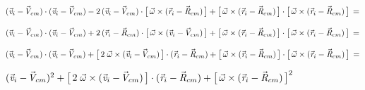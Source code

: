\documentclass[10pt]{article}
\begin{document}
\par \bigskip\smallskip \noindent $({\vec{\mathit{v}}}_i - \hspace{-0.120em}{\vec{\mathit{V}}}_{cm}) \cdot ({\vec{\mathit{v}}}_i - \hspace{-0.120em}{\vec{\mathit{V}}}_{cm}) - 2 \, ({\vec{\mathit{v}}}_i - \hspace{-0.120em}{\vec{\mathit{V}}}_{cm}) \cdot \big [ \, {\vec{\omega}} \times ({\vec{\mathit{r}}}_i - {\vec{\mathit{R}}}_{cm}) \, \big ] + \big [ \, {\vec{\omega}} \times ({\vec{\mathit{r}}}_i - {\vec{\mathit{R}}}_{cm}) \, \big ] \cdot \big [ \, {\vec{\omega}} \times ({\vec{\mathit{r}}}_i - {\vec{\mathit{R}}}_{cm}) \, \big ] \,=$

\par \bigskip\smallskip \noindent $({\vec{\mathit{v}}}_i - \hspace{-0.120em}{\vec{\mathit{V}}}_{cm}) \cdot ({\vec{\mathit{v}}}_i - \hspace{-0.120em}{\vec{\mathit{V}}}_{cm}) + 2 \, ({\vec{\mathit{r}}}_i - {\vec{\mathit{R}}}_{cm}) \cdot \big [ \, {\vec{\omega}} \times ({\vec{\mathit{v}}}_i - \hspace{-0.120em}{\vec{\mathit{V}}}_{cm}) \, \big ] + \big [ \, {\vec{\omega}} \times ({\vec{\mathit{r}}}_i - {\vec{\mathit{R}}}_{cm}) \, \big ] \cdot \big [ \, {\vec{\omega}} \times ({\vec{\mathit{r}}}_i - {\vec{\mathit{R}}}_{cm}) \, \big ] \,=$

\par \bigskip\smallskip \noindent $({\vec{\mathit{v}}}_i - \hspace{-0.120em}{\vec{\mathit{V}}}_{cm}) \cdot ({\vec{\mathit{v}}}_i - \hspace{-0.120em}{\vec{\mathit{V}}}_{cm}) + \big [ \, 2 \; {\vec{\omega}} \times ({\vec{\mathit{v}}}_i - \hspace{-0.120em}{\vec{\mathit{V}}}_{cm}) \, \big ] \cdot ({\vec{\mathit{r}}}_i - {\vec{\mathit{R}}}_{cm}) + \big [ \, {\vec{\omega}} \times ({\vec{\mathit{r}}}_i - {\vec{\mathit{R}}}_{cm}) \, \big ] \cdot \big [ \, {\vec{\omega}} \times ({\vec{\mathit{r}}}_i - {\vec{\mathit{R}}}_{cm}) \, \big ] \,=$

\par \bigskip\smallskip \noindent $({\vec{\mathit{v}}}_i - \hspace{-0.120em}{\vec{\mathit{V}}}_{cm})^2 + \big [ \, 2 \; {\vec{\omega}} \times ({\vec{\mathit{v}}}_i - \hspace{-0.120em}{\vec{\mathit{V}}}_{cm}) \, \big ] \cdot ({\vec{\mathit{r}}}_i - {\vec{\mathit{R}}}_{cm}) + \big [ \, {\vec{\omega}} \times ({\vec{\mathit{r}}}_i - {\vec{\mathit{R}}}_{cm}) \, \big ]^2$
\end{document}
